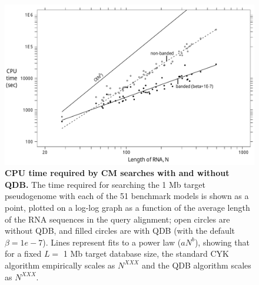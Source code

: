 \begin{figure}
\begin{center}
\includegraphics[width=6.4in]{figs/speedup_fit}
\caption{\textbf{CPU time required by CM searches with and without
    QDB.} The time required for searching the 1 Mb target pseudogenome
    with each of the 51 benchmark models is shown as a point, plotted
    on a log-log graph as a function of the average length of the RNA
    sequences in the query alignment; open circles are without QDB,
    and filled circles are with QDB (with the default $\beta =
    1e-7$). Lines represent fits to a power law ($aN^b$), showing that
    for a fixed $L=$ 1 Mb target database size, the standard CYK
    algorithm empirically scales as $N^{XXX}$ and the QDB algorithm
    scales as $N^{XXX}$.
}
\label{fig:speedup}
\end{center}
\end{figure}
